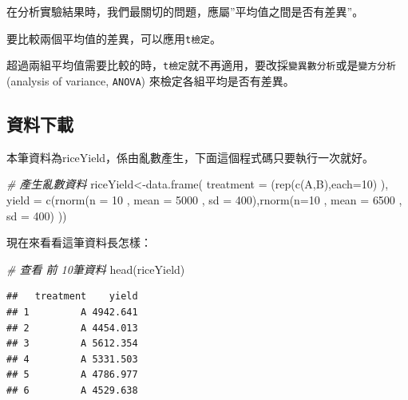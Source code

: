 \documentclass[
]{book}
\newenvironment{Shaded}{\begin{snugshade}}{\end{snugshade}}
\newcommand{\AttributeTok}[1]{\textcolor[rgb]{0.77,0.63,0.00}{#1}}
\newcommand{\CommentTok}[1]{\textcolor[rgb]{0.56,0.35,0.01}{\textit{#1}}}
\newcommand{\DecValTok}[1]{\textcolor[rgb]{0.00,0.00,0.81}{#1}}
\newcommand{\FunctionTok}[1]{\textcolor[rgb]{0.00,0.00,0.00}{#1}}
\newcommand{\NormalTok}[1]{#1}
\newcommand{\OtherTok}[1]{\textcolor[rgb]{0.56,0.35,0.01}{#1}}
\newcommand{\StringTok}[1]{\textcolor[rgb]{0.31,0.60,0.02}{#1}}
\begin{document}
在分析實驗結果時，我們最關切的問題，應屬''平均值之間是否有差異''。

要比較兩個平均值的差異，可以應用\texttt{t檢定}。

超過兩組平均值需要比較的時，\texttt{t檢定}就不再適用，要改採\texttt{變異數分析}或是\texttt{變方分析} (analysis of variance, \texttt{ANOVA}) 來檢定各組平均是否有差異。

\hypertarget{ux8cc7ux6599ux4e0bux8f09}{%
\subsection{資料下載}\label{ux8cc7ux6599ux4e0bux8f09}}

本筆資料為riceYield，係由亂數產生，下面這個程式碼只要執行一次就好。

\begin{Shaded}
\begin{Highlighting}[]
\CommentTok{\# 產生亂數資料}
\NormalTok{riceYield}\OtherTok{\textless{}{-}}\FunctionTok{data.frame}\NormalTok{(}
  \StringTok{\textquotesingle{}treatment\textquotesingle{}} \OtherTok{=}\NormalTok{ (}\FunctionTok{rep}\NormalTok{(}\FunctionTok{c}\NormalTok{(}\StringTok{\textquotesingle{}A\textquotesingle{}}\NormalTok{,}\StringTok{\textquotesingle{}B\textquotesingle{}}\NormalTok{),}\AttributeTok{each=}\DecValTok{10}\NormalTok{) ),}
  \StringTok{\textquotesingle{}yield\textquotesingle{}} \OtherTok{=} \FunctionTok{c}\NormalTok{(}\FunctionTok{rnorm}\NormalTok{(}\AttributeTok{n =} \DecValTok{10}\NormalTok{ , }\AttributeTok{mean =} \DecValTok{5000}\NormalTok{ , }\AttributeTok{sd =} \DecValTok{400}\NormalTok{),}\FunctionTok{rnorm}\NormalTok{(}\AttributeTok{n=}\DecValTok{10}\NormalTok{ , }\AttributeTok{mean =} \DecValTok{6500}\NormalTok{ , }\AttributeTok{sd =} \DecValTok{400}\NormalTok{)}
\NormalTok{))}
\end{Highlighting}
\end{Shaded}

現在來看看這筆資料長怎樣：

\begin{Shaded}
\begin{Highlighting}[]
\CommentTok{\# 查看 前 10筆資料}
\FunctionTok{head}\NormalTok{(riceYield)}
\end{Highlighting}
\end{Shaded}

\begin{verbatim}
##   treatment    yield
## 1         A 4942.641
## 2         A 4454.013
## 3         A 5612.354
## 4         A 5331.503
## 5         A 4786.977
## 6         A 4529.638
\end{verbatim}
\end{document}
